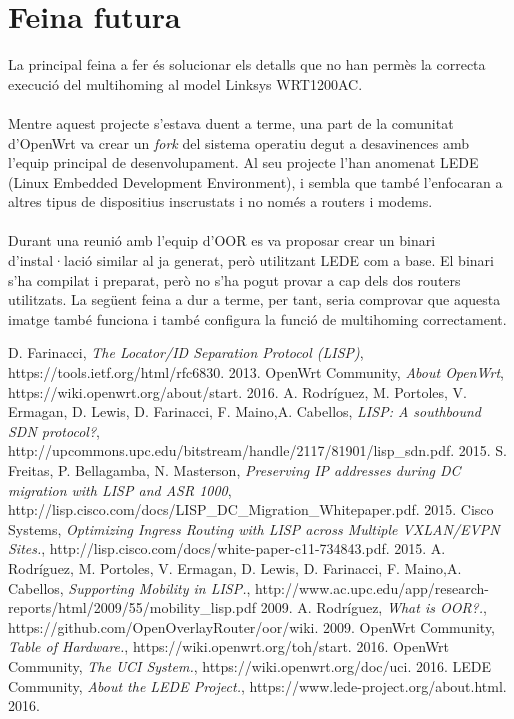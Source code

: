 \documentclass[11pt]{article}
\begin{document}
\section{Feina futura}
La principal feina a fer és solucionar els detalls que no han permès la correcta execució del multihoming al model Linksys WRT1200AC.\\
\\
Mentre aquest projecte s'estava duent a terme, una part de la comunitat d'OpenWrt va crear un \textit{fork} del sistema operatiu degut a desavinences amb l'equip principal de desenvolupament. Al seu projecte l'han anomenat LEDE (Linux Embedded Development Environment), i sembla que també l'enfocaran a altres tipus de dispositius inscrustats i no només a routers i modems\cite{lede16}.\\
\\
Durant una reunió amb l'equip d'OOR es va proposar crear un binari d'instal·lació similar al ja generat, però utilitzant LEDE com a base. El binari s'ha compilat i preparat, però no s'ha pogut provar a cap dels dos routers utilitzats. La següent feina a dur a terme, per tant, seria comprovar que aquesta imatge també funciona i també configura la funció de multihoming correctament.


\begin{thebibliography}{9}

  D. Farinacci,
  \emph{The Locator/ID Separation Protocol (LISP)},
  https://tools.ietf.org/html/rfc6830.
  2013.
  OpenWrt Community,
  \emph{About OpenWrt},
  https://wiki.openwrt.org/about/start.
  2016.
  A. Rodríguez, M. Portoles, V. Ermagan, D. Lewis, D. Farinacci, F. Maino,A. Cabellos,
  \emph{LISP: A southbound SDN protocol?},
  http://upcommons.upc.edu/bitstream/handle/2117/81901/lisp\_sdn.pdf.
  2015.
  S. Freitas, P. Bellagamba, N. Masterson,
  \emph{Preserving IP addresses during DC  migration with LISP and ASR 1000},
  http://lisp.cisco.com/docs/LISP\_DC\_Migration\_Whitepaper.pdf.
  2015.
  Cisco Systems,
  \emph{Optimizing Ingress Routing with LISP across Multiple VXLAN/EVPN Sites.},
  http://lisp.cisco.com/docs/white-paper-c11-734843.pdf.
  2015.
  A. Rodríguez, M. Portoles, V. Ermagan, D. Lewis, D. Farinacci, F. Maino,A. Cabellos,
  \emph{Supporting Mobility in LISP.},
  http://www.ac.upc.edu/app/research-reports/html/2009/55/mobility\_lisp.pdf
  2009.
  A. Rodríguez,
  \emph{What is OOR?.},
	https://github.com/OpenOverlayRouter/oor/wiki.
	2009.
  OpenWrt Community,
  \emph{Table of Hardware.},
	https://wiki.openwrt.org/toh/start.
	2016.
  OpenWrt Community,
  \emph{The UCI System.},
	https://wiki.openwrt.org/doc/uci.
	2016.
  LEDE Community,
  \emph{About the LEDE Project.},
	https://www.lede-project.org/about.html.
	2016.
	
\end{thebibliography}
\end{document}
